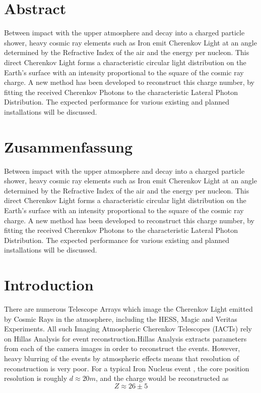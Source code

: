 \documentclass{article}
\begin{document}
\section*{Abstract}
Between impact with the upper atmosphere and decay into a charged particle shower, heavy cosmic ray elements such as Iron emit Cherenkov Light at an angle determined by the Refractive Index of the air and the energy per nucleon. This direct Cherenkov Light forms a characteristic circular light distribution on the Earth's surface with an intensity proportional to the square of the cosmic ray charge. A new method has been developed to reconstruct this charge number, by fitting the received Cherenkov Photons to the characteristic Lateral Photon Distribution. The expected performance for various existing and planned installations will be discussed.

\section*{Zusammenfassung}
Between impact with the upper atmosphere and decay into a charged particle shower, heavy cosmic ray elements such as Iron emit Cherenkov Light at an angle determined by the Refractive Index of the air and the energy per nucleon. This direct Cherenkov Light forms a characteristic circular light distribution on the Earth's surface with an intensity proportional to the square of the cosmic ray charge. A new method has been developed to reconstruct this charge number, by fitting the received Cherenkov Photons to the characteristic Lateral Photon Distribution. The expected performance for various existing and planned installations will be discussed.
\newpage
\tableofcontents
\newpage
\section{Introduction}
There are numerous Telescope Arrays which image the Cherenkov Light emitted by Cosmic Rays in the atmosphere, including the HESS, Magic and Veritas Experiments. All such Imaging Atmospheric Cherenkov Telescopes (IACTs) rely on Hillas Analysis for event reconstruction.Hillas Analysis extracts parameters from each of the camera images in order to reconstruct the events. However, heavy blurring of the events by atmospheric effects means that resolution of reconstruction  is very poor. For a typical Iron Nucleus event \cite{hess07}, the core position resolution is roughly $d \approx 20 m $, and the charge would be reconstructed as \[Z \approx 26 \pm 5 \]
\end{document}
